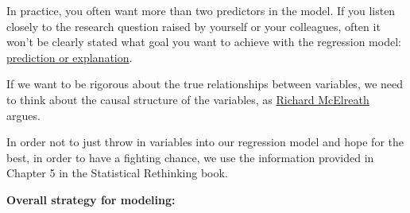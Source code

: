 \documentclass[
]{book}
\begin{document}
In practice, you often want more than two predictors in the model.
If you listen closely to the research question raised by yourself or
your colleagues, often it won't be clearly stated what goal you want to achieve
with the regression model:
\href{https://projecteuclid.org/journals/statistical-science/volume-25/issue-3/To-Explain-or-to-Predict/10.1214/10-STS330.full}{prediction or explanation}.

If we want to be rigorous about the true relationships between variables,
we need to think about the causal structure of the variables,
as \href{https://www.youtube.com/watch?v=YvhuYONl1o0&ab_channel=KI-Campus}{Richard McElreath}
argues.

In order not to just throw in variables into our regression model and hope for the best,
in order to have a fighting chance, we use the information provided
in Chapter 5 in the Statistical Rethinking book.

\textbf{Overall strategy for modeling:}
\end{document}
